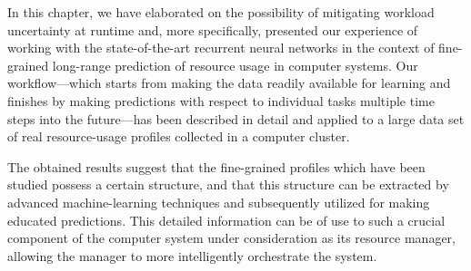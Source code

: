 In this chapter, we have elaborated on the possibility of mitigating workload
uncertainty at runtime and, more specifically, presented our experience of
working with the state-of-the-art recurrent neural networks in the context of
fine-grained long-range prediction of resource usage in computer systems. Our
workflow---which starts from making the data readily available for learning and
finishes by making predictions with respect to individual tasks multiple time
steps into the future---has been described in detail and applied to a large data
set of real resource-usage profiles collected in a computer cluster.

The obtained results suggest that the fine-grained profiles which have been
studied possess a certain structure, and that this structure can be extracted by
advanced machine-learning techniques and subsequently utilized for making
educated predictions. This detailed information can be of use to such a crucial
component of the computer system under consideration as its resource manager,
allowing the manager to more intelligently orchestrate the system.
